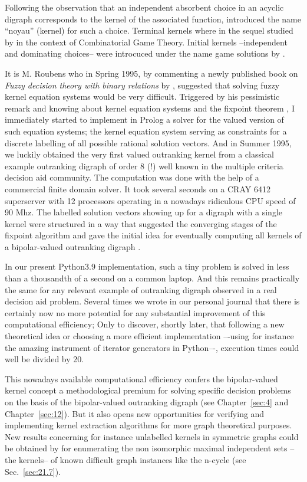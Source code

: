 Following the observation that an independent absorbent choice in an acyclic digraph corresponds to the kernel of the associated \Grundy function, \citet{RIG-1948} introduced the name ``noyau'' (kernel) for such a choice. Terminal kernels where in the sequel studied by \citet{BER-1958} in the context of Combinatorial Game Theory. Initial kernels --independent and dominating choices-- were introcuced under the name game solutions by \citet{NEU-1944}.

It is M. Roubens who in Spring 1995, by commenting a newly published book on \emph{Fuzzy decision theory with binary relations} by \cite{KIT-1993}, suggested that solving fuzzy kernel equation systems would be very difficult. Triggered by his pessimistic remark and knowing about kernel equation systems and the \Neumann fixpoint theorem \citep{NEU-1944,SCH-1985}, I immediately started to implement in Prolog a solver for the valued version of such equation systems; the kernel equation system serving as constraints for a discrete labelling of all possible rational solution vectors. And in Summer 1995, we luckily obtained the very first valued outranking kernel from a classical example outranking digraph of order 8 (!) well known in the multiple criteria decision aid community. The computation was done with the help of a commercial finite domain solver. It took several seconds on a CRAY 6412 superserver with 12 processors operating in a nowadays ridiculous CPU speed of 90 Mhz. The labelled solution vectors showing up for a digraph with a single kernel were structured in a way that suggested the converging stages of the \Neumann fixpoint algorithm and gave the initial idea for eventually computing all kernels of a bipolar-valued outranking digraph \citep*{BIS-1996,BIS-1997,BIS-2004d}. 

In our present Python3.9 implementation, such a tiny problem is solved in less than a thousandth of a second on a common laptop. And this remains practically the same for any relevant example of outranking digraph observed in a real decision aid problem. Several times we wrote in our personal journal that there is certainly now no more potential for any substantial improvement of this computational efficiency; Only to discover, shortly later, that following a new theoretical idea or choosing a more efficient implementation –-using for instance the amazing instrument of iterator generators in Python–-, execution times could well be divided by 20.

This nowadays available computational efficiency confers the bipolar-valued kernel concept a methodological premium for solving specific decision problems on the basis of the bipolar-valued outranking digraph (see Chapter~\ref{sec:4} and Chapter~\ref{sec:12}). But it also opens new opportunities for verifying and implementing kernel extraction algorithms for more graph theoretical purposes. New results concerning for instance unlabelled kernels in symmetric graphs could be obtained by \citep*{ISO-2008} for enumerating the non isomorphic maximal independent sets --the kernels-- of known difficult graph instances like the n-cycle (see Sec.~\ref{sec:21.7}).

\clearpage


%